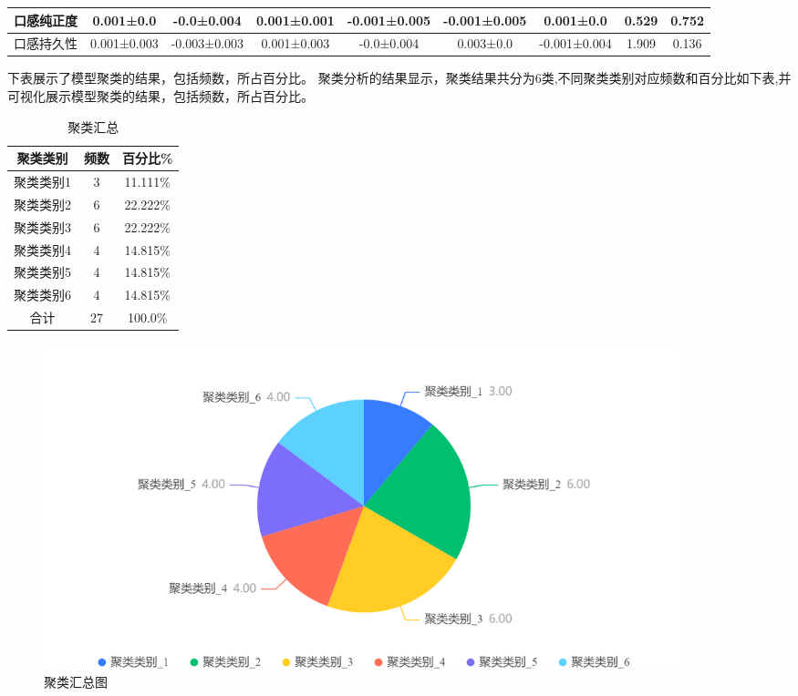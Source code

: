\documentclass[UTF8]{ctexart}
\begin{document}
\begin{itemize}
\begin{itemize}
\begin{table}[!ht]
{{\begin{tabular}{|c|c|c|c|c|c|c|c|c|}
						            口感纯正度                                      & 0.001±0.0   & -0.0±0.004   & 0.001±0.001  & -0.001±0.005 & -0.001±0.005 & 0.001±0.0    & 0.529    & 0.752    \\ \hline
						            口感持久性                                      & 0.001±0.003 & -0.003±0.003 & 0.001±0.003  & -0.0±0.004   & 0.003±0.0    & -0.001±0.004 & 1.909    & 0.136    \\ \hline
					            \end{tabular}}}
		            \end{table}


		            下表展示了模型聚类的结果，包括频数，所占百分比。
		            聚类分析的结果显示，聚类结果共分为6类,不同聚类类别对应频数和百分比如下表,并可视化展示模型聚类的结果，包括频数，所占百分比。

		            \begin{table}[!ht]
			            \centering
			            \caption{聚类汇总}
			            \begin{tabular}{|c|c|c|}
				            \hline
				            聚类类别  & 频数 & 百分比\% \\ \hline
				            聚类类别1 & 3    & 11.111\% \\ \hline
				            聚类类别2 & 6    & 22.222\% \\ \hline
				            聚类类别3 & 6    & 22.222\% \\ \hline
				            聚类类别4 & 4    & 14.815\% \\ \hline
				            聚类类别5 & 4    & 14.815\% \\ \hline
				            聚类类别6 & 4    & 14.815\% \\ \hline
				            合计      & 27   & 100.0\%  \\ \hline
			            \end{tabular}
		            \end{table}


		            \begin{figure}[H]\centering
			            \includegraphics[width=0.9\textwidth]{img/2/Cluster_summary.png} %
			            \caption{聚类汇总图} %
			            \label{fig:figure 10} %
		            \end{figure}


\end{itemize}
\end{itemize}
\end{document}
